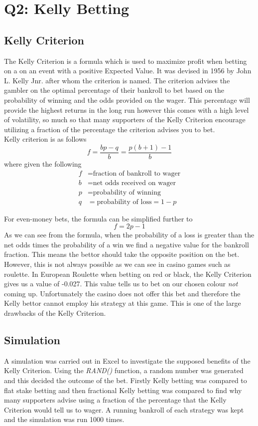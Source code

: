 \documentclass[12pt]{article}
\begin{document}
\section{Q2: Kelly Betting}
\subsection{Kelly Criterion}
The Kelly Criterion is a formula which is used to maximize profit when betting on a on an event with a positive Expected Value. It was devised in 1956 by John L. Kelly Jnr. after whom the criterion is named. The criterion advises the gambler on the optimal percentage of their bankroll to bet based on the probability of winning and the odds provided on the wager. This percentage will provide the highest returns in the long run however this comes with a high level of volatility, so much so that many supporters of the Kelly Criterion encourage utilizing a fraction of the percentage the criterion advises you to bet.
\\
Kelly criterion is as follows
$$f=\frac{bp-q}{b}=\frac{p(b+1)-1}{b}$$
where given the following
\begin{align*}
f&=\text{fraction of bankroll to wager}\\
b&=\text{net odds received on wager}\\
p&=\text{probability of winning}\\
q&=\text{probability of loss}=1-p
\end{align*}

For even-money bets, the formula can be simplified further to
$$f=2p-1$$
As we can see from the formula, when the probability of a loss is greater than the net odds times the probability of a win we find a negative value for the bankroll fraction. This means the bettor should take the opposite position on the bet. However, this is not always possible as we can see in casino games such as roulette. In European Roulette when betting on red or black, the Kelly Criterion gives us a value of -0.027. This value tells us to bet on our chosen colour \emph{not} coming up. Unfortunately the casino does not offer this bet and therefore the Kelly bettor cannot employ his strategy at this game. This is one of the large drawbacks of the Kelly Criterion.

\subsection{Simulation}
A simulation was carried out in Excel to investigate the supposed benefits of the Kelly Criterion. Using the \emph{RAND()} function, a random number was generated and this decided the outcome of the bet. Firstly Kelly betting was compared to flat stake betting and then fractional Kelly betting was compared to find why many supporters advise using a fraction of the percentage that the Kelly Criterion would tell us to wager. A running bankroll of each strategy was kept and the simulation was run 1000 times.
\end{document}
